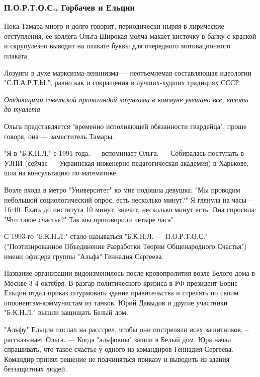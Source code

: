  
 
 

\subsubsection{П.О.Р.Т.О.С., Горбачев и Ельцин}

Пока Тамара много и долго говорит, периодически ныряя в лирические отступления,
ее коллега Ольга Широкая молча макает кисточку в банку с краской и скрупулезно
выводит на плакате буквы для очередного мотивационного плаката. 

Лозунги в духе марксизма-ленинизма --- неотъемлемая составляющая идеологии
"С.П.А.Р.Т.Ы.", равно как и сокращения в лучших-худших традициях СССР.

\emph{Отдающими советской пропагандой лозунгами в коммуне увешано все, вплоть до туалета}

Ольга представляется "временно исполняющей обязанности гвардейца", проще
говоря, она --- заместитель Тамары.

"Я в "Б.К.Н.Л." с 1991 года, --- вспоминает Ольга. --- Собиралась поступать в УЗПИ
(сейчас --- Украинская инженерно-педагогическая академия) в Харькове, шла на
консультацию по математике. 

Возле входа в метро "Университет" ко мне подошла девушка: "Мы проводим
небольшой социологический опрос, есть несколько минут?" Я глянула на часы –
16:40. Ехать до института 10 минут, значит, несколько минут есть. Она спросила:
"Что такое счастье?" Так мы проговорили четыре часа".

С 1993-го "Б.К.Н.Л." стало называться "Б.К.Н.Л. --- П.О.Р.Т.О.С."
("Поэтизированное Объединение Разработки Теории Общенародного Счастья") имени
офицера группы "Альфа" Геннадия Сергеева. 

Название организации видоизменилось после кровопролития возле Белого дома в
Москве 3-4 октября. В разгар политического кризиса в РФ президент Борис Ельцин
отдал приказ штурмовать здание правительства и стрелять по своим
оппонентам-коммунистам из танков. Юрий Давыдов и другие участники "Б.К.Н.Л."
вышли защищать Белый дом.

"Альфу" Ельцин послал на расстрел, чтобы они постреляли всех защитников, –
рассказывает Ольга. --- Когда "альфовцы" зашли в Белый дом, Юра начал спрашивать,
что такое счастье у одного из командиров Геннадия Сергеева. Командир принял
решение не подчиняться приказу и выводить из здания беззащитных людей. 

